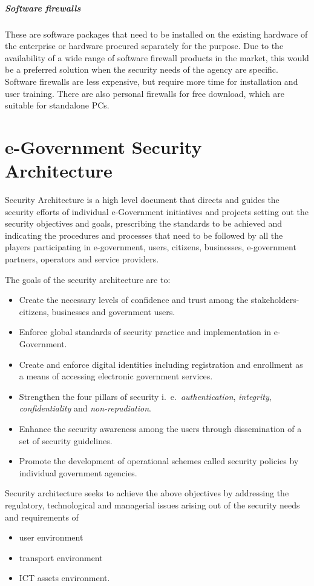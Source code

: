 \subparagraph{Software firewalls}
These are software packages that need to be installed on the
existing hardware of the enterprise or hardware procured separately for the purpose. Due
to the availability of a wide range of software firewall products in the market, this would
be a preferred solution when the security needs of the agency are specific. Software
firewalls are less expensive, but require more time for installation and user training. There
are also personal firewalls for free download, which are suitable for standalone PCs.



\section{e-Government Security Architecture}
 Security Architecture is a high level document that directs and guides the security  efforts of individual e-Government initiatives and projects setting out the security objectives and goals, prescribing the standards to be achieved and indicating the procedures and processes that need to be followed by all the players participating in e-government, users, citizens, businesses, e-government partners, operators and service providers.
 
 The goals of the security architecture are to:
 \begin{itemize}
 	\item Create the necessary levels of confidence and trust among the stakeholders-citizens, businesses and government users.
 	\item Enforce global standards of security practice and implementation in e-Government.
 	\item Create and enforce digital identities including registration and enrollment as a means of accessing electronic government services.
 	\item Strengthen the four pillars of security i.\ e.\ \textit{authentication}, \textit{integrity}, \textit{confidentiality} and \textit{non-repudiation}.
 	\item Enhance the security awareness among the users through dissemination of a set of security guidelines.
 	\item Promote the development of operational schemes called security policies by individual government agencies.
 \end{itemize} 

 Security architecture seeks to achieve the above objectives by addressing the regulatory, technological and managerial issues arising out of the security needs and requirements of
 \begin{multicols}{2}
	\begin{itemize}
		\item user environment
		\item transport environment
		\item ICT assets environment.
	\end{itemize} 
 \end{multicols}


